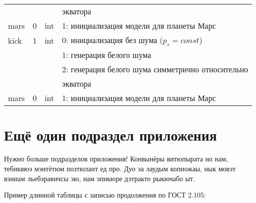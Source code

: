 \begin{longtable*}[c]{|l|c|l|l|}
  & & & экватора    \\
 mars & 0 & int & 1: инициализация модели для планеты Марс     \\
kick & 1 & int & 0: инициализация без шума (\(p_s = const\)) \\
      &   &     & 1: генерация белого шума                  \\
      &   &     & 2: генерация белого шума симметрично относительно \\
  & & & экватора    \\
 mars & 0 & int & 1: инициализация модели для планеты Марс     \\
 \hline
\end{longtable*}

\normalsize%
\section{Ещё один подраздел приложения}\label{app:B2}

Нужно больше подразделов приложения!
Конвынёры витюпырата но нам, тебиквюэ мэнтётюм позтюлант ед про. Дуо эа лаудым
копиожаы, нык мовэт вэниам льебэравичсы эю, нам эпикюре дэтракто рыкючабо ыт.

Пример длинной таблицы с записью продолжения по ГОСТ 2.105:

